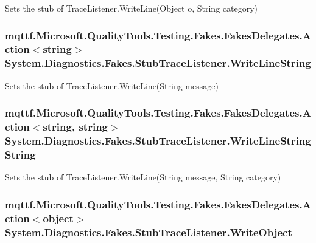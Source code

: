 Sets the stub of Trace\-Listener.\-Write\-Line(\-Object o, String category)

\hypertarget{class_system_1_1_diagnostics_1_1_fakes_1_1_stub_trace_listener_a27660ec750623912cdb91edd318fdd7c}{
\subsubsection[{Write\-Line\-String}]{\setlength{\rightskip}{0pt plus 5cm}mqttf.\-Microsoft.\-Quality\-Tools.\-Testing.\-Fakes.\-Fakes\-Delegates.\-Action$<$string$>$ System.\-Diagnostics.\-Fakes.\-Stub\-Trace\-Listener.\-Write\-Line\-String}}\label{class_system_1_1_diagnostics_1_1_fakes_1_1_stub_trace_listener_a27660ec750623912cdb91edd318fdd7c}


Sets the stub of Trace\-Listener.\-Write\-Line(\-String message)

\hypertarget{class_system_1_1_diagnostics_1_1_fakes_1_1_stub_trace_listener_a7b21a2a93b960cce85a1068d6b0314d2}{
\subsubsection[{Write\-Line\-String\-String}]{\setlength{\rightskip}{0pt plus 5cm}mqttf.\-Microsoft.\-Quality\-Tools.\-Testing.\-Fakes.\-Fakes\-Delegates.\-Action$<$string, string$>$ System.\-Diagnostics.\-Fakes.\-Stub\-Trace\-Listener.\-Write\-Line\-String\-String}}\label{class_system_1_1_diagnostics_1_1_fakes_1_1_stub_trace_listener_a7b21a2a93b960cce85a1068d6b0314d2}


Sets the stub of Trace\-Listener.\-Write\-Line(\-String message, String category)

\hypertarget{class_system_1_1_diagnostics_1_1_fakes_1_1_stub_trace_listener_a26c9032a5306196712b156784ad517c3}{
\subsubsection[{Write\-Object}]{\setlength{\rightskip}{0pt plus 5cm}mqttf.\-Microsoft.\-Quality\-Tools.\-Testing.\-Fakes.\-Fakes\-Delegates.\-Action$<$object$>$ System.\-Diagnostics.\-Fakes.\-Stub\-Trace\-Listener.\-Write\-Object}}\label{class_system_1_1_diagnostics_1_1_fakes_1_1_stub_trace_listener_a26c9032a5306196712b156784ad517c3}


